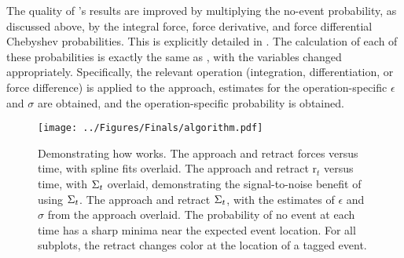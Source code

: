 The quality of \name{}'s results are improved by multiplying the no-event probability, as discussed above, by the integral force, force derivative, and force differential Chebyshev probabilities. This is explicitly detailed in . The calculation of each of these probabilities is exactly the same as , with the variables changed appropriately. Specifically, the relevant operation (integration, differentiation, or force difference) is applied to the approach, estimates for the operation-specific $\epsilon$ and $\sigma$ are obtained, and the operation-specific probability is obtained.


\begin{figure}[htp]
\caption[\name{} algorithmic pipeline]{\noindent{} Demonstrating how \name{} works.  The approach and retract forces versus time, with spline fits overlaid.  The approach and retract r$_t$ versus time, with $\Sigma_t$ overlaid, demonstrating the signal-to-noise benefit of using $\Sigma_t$.  The approach and retract $\Sigma_t$, with the estimates of $\epsilon$ and $\sigma$ from the approach overlaid.  The probability of no event at each time has a sharp minima near the expected event location. For all subplots, the retract changes color at the location of a tagged event.  }
\centering
\texttt{[image: ../Figures/Finals/algorithm.pdf]}%
\end{figure}

